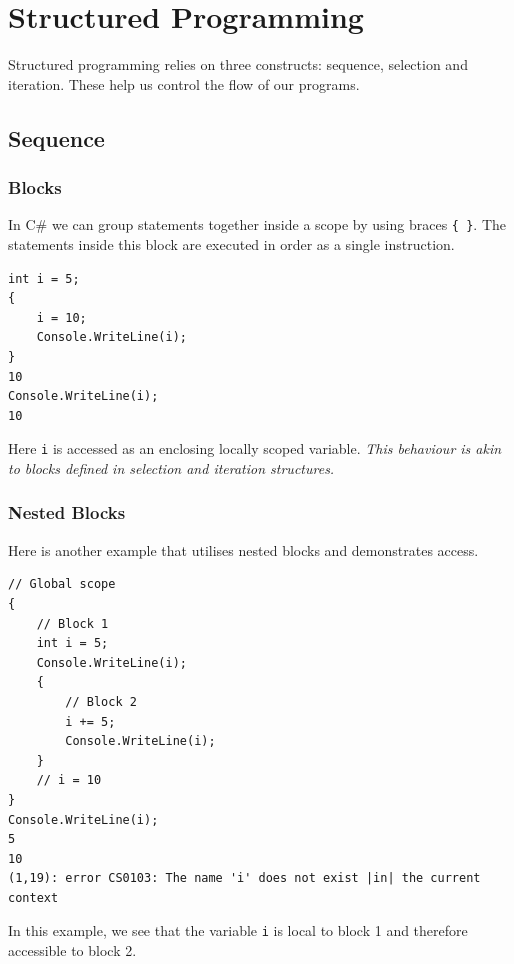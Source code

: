 \documentclass{article}
\def\customlinemarker#1#2{
    \edef\thelstnumber{%
        \unexpanded{%
            \ifnum#1=\value{lstnumber}\relax
              #2%
            \fi}%
        \ifx\thelstnumber\relax\else
        \expandafter\unexpanded\expandafter{\thelstnumber}%
        \fi
    }
}
\begin{document}
\section{Structured Programming}
Structured programming relies on three constructs: sequence, selection and iteration.
These help us control the flow of our programs.
\subsection{Sequence}
\subsubsection{Blocks}
In C\# we can group statements together inside a scope by using braces \lstinline!{ }!.
The statements inside this block are executed in order as a single instruction.
\begingroup
\let\thelstnumber\relax
\customlinemarker{1}{\$}
\customlinemarker{2}{.}
\customlinemarker{3}{.}
\customlinemarker{4}{.}
\customlinemarker{5}{.}
\customlinemarker{7}{\$}
\begin{lstlisting}
int i = 5;
{
    i = 10;
    Console.WriteLine(i);
}
10
Console.WriteLine(i);
10
\end{lstlisting}
\endgroup
Here \lstinline{i} is accessed as an enclosing locally scoped variable.
\emph{This behaviour is akin to blocks defined in selection and iteration structures.}
\subsubsection{Nested Blocks}
Here is another example that utilises nested blocks and demonstrates access.

\begingroup
\let\thelstnumber\relax
\customlinemarker{1}{\$}
\customlinemarker{2}{\$}
\customlinemarker{3}{.}
\customlinemarker{4}{.}
\customlinemarker{5}{.}
\customlinemarker{6}{.}
\customlinemarker{7}{.}
\customlinemarker{8}{.}
\customlinemarker{9}{.}
\customlinemarker{10}{.}
\customlinemarker{11}{.}
\customlinemarker{12}{.}
\customlinemarker{13}{\$}
\begin{lstlisting}[escapeinside=||]
// Global scope    
{
    // Block 1     
    int i = 5;  
    Console.WriteLine(i);
    {
        // Block 2
        i += 5;
        Console.WriteLine(i);
    }
    // i = 10
}
Console.WriteLine(i);
5
10
(1,19): error CS0103: The name 'i' does not exist |in| the current context
\end{lstlisting}
\endgroup
In this example, we see that the variable \lstinline{i} is local to block 1 and therefore accessible to block 2.
\end{document}
